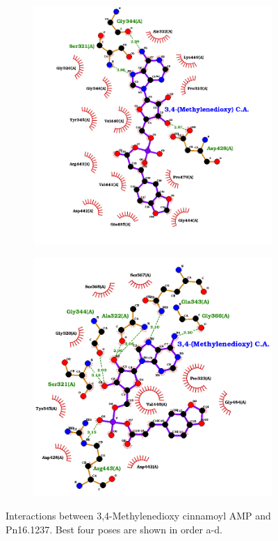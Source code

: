 \documentclass[12pt]{article}
\begin{document}
\begin{figure}[h!]
\begin{subfigure}[h!]{0.35\textwidth}
			\caption{}
		\end{subfigure}
		\hfill
		\begin{subfigure}[h!]{0.35\textwidth}
			\hspace{2cm}
			\includegraphics[width=\textwidth]{../6/known/Dock/best3.png}
			\caption{}
		\end{subfigure}
		\hfill
		\begin{subfigure}[h!]{0.35\textwidth}
			\hspace{-2cm}
			\includegraphics[width=\textwidth]{../6/known/Dock/best4.png}
			\caption{}
		\end{subfigure}
		\hfill
		\caption[Interactions between 3,4-Methylenedioxy cinnamoyl AMP and Pn16.1237]{Interactions between 3,4-Methylenedioxy cinnamoyl AMP and Pn16.1237. Best four poses are shown in order a-d.}
		\label{fig6k_4}
	\end{figure}
\end{document}
